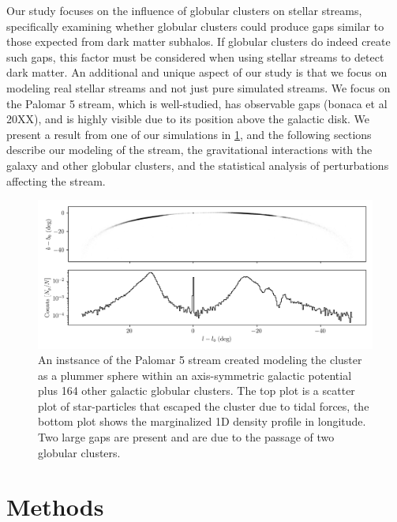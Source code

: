 \documentclass[draft]{aa}
\begin{document}
  Our study focuses on the influence of globular clusters on stellar streams, specifically examining whether globular clusters could produce gaps similar to those expected from dark matter subhalos. If globular clusters do indeed create such gaps, this factor must be considered when using stellar streams to detect dark matter. An additional and unique aspect of our study is that we focus on modeling real stellar streams and not just pure simulated streams. We focus on the Palomar 5 stream, which is well-studied, has observable gaps (bonaca et al 20XX), and is highly visible due to its position above the galactic disk. We present a result from one of our simulations in \ref{fig:stream_on_sky}, and the following sections describe our modeling of the stream, the gravitational interactions with the galaxy and other globular clusters, and the statistical analysis of perturbations affecting the stream.


  \begin{figure}
    \centering
    \includegraphics[width=\linewidth]{stream_on_sky_Pal5_monte-carlo-009_pouliasis2017pii-GCNBody.png}
    \caption{An instsance of the Palomar 5 stream created modeling the cluster as a plummer sphere within an axis-symmetric galactic potential plus 164 other galactic globular clusters. The top plot is a scatter plot of star-particles that escaped the cluster due to tidal forces, the bottom plot shows the marginalized 1D density profile in longitude. Two large gaps are present and are due to the passage of two globular clusters.}
    \label{fig:stream_on_sky}
    \end{figure}










\section{Methods}
\end{document}
